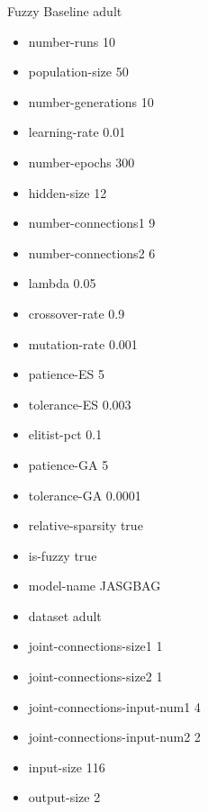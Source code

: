 Fuzzy Baseline
adult
\begin{itemize}
\item number-runs 10
\item population-size 50
\item number-generations 10
\item learning-rate 0.01
\item number-epochs 300
\item hidden-size 12
\item number-connections1 9
\item number-connections2 6
\item lambda 0.05
\item crossover-rate 0.9
\item mutation-rate 0.001
\item patience-ES 5
\item tolerance-ES 0.003
\item elitist-pct 0.1
\item patience-GA 5
\item tolerance-GA 0.0001
\item relative-sparsity true
\item is-fuzzy true
\item model-name JASGBAG
\item dataset adult
\item joint-connections-size1 1
\item joint-connections-size2 1
\item joint-connections-input-num1 4
\item joint-connections-input-num2 2
\item input-size 116
\item output-size 2
\end{itemize}

